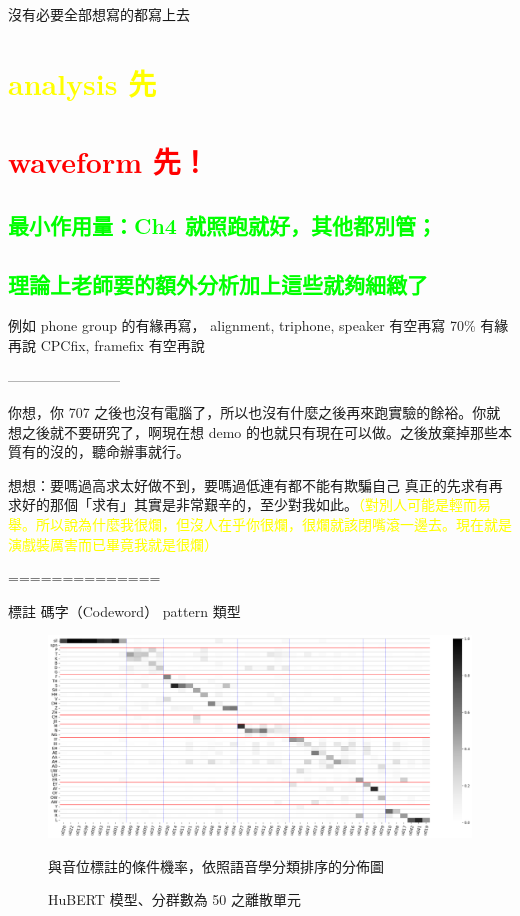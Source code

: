 
沒有必要全部想寫的都寫上去

\chapter{\textcolor{yellow}{analysis 先}}
\chapter{\textcolor{red}{waveform 先！}}

\section{\textcolor{lime}{最小作用量：Ch4 就照跑就好，其他都別管；}}
\section{\textcolor{lime}{理論上老師要的額外分析加上這些就夠細緻了}}

例如 phone group 的有緣再寫，
alignment, triphone, speaker 有空再寫
70\% 有緣再說
CPCfix, framefix 有空再說

\centering

------------------------

你想，你 707 之後也沒有電腦了，所以也沒有什麼之後再來跑實驗的餘裕。你就想之後就不要研究了，啊現在想 demo 的也就只有現在可以做。之後放棄掉那些本質有的沒的，聽命辦事就行。

想想：要嗎過高求太好做不到，要嗎過低連有都不能有欺騙自己
真正的先求有再求好的那個「求有」其實是非常艱辛的，至少對我如此。\textcolor{yellow}{（對別人可能是輕而易舉。所以說為什麼我很爛，但沒人在乎你很爛，很爛就該閉嘴滾一邊去。現在就是演戲裝厲害而已畢竟我就是很爛）}

==============

標註
碼字（Codeword）
pattern 類型



\begin{figure}
    \centering
    \includegraphics[width=1\linewidth]{figures/hubert-50-givenunit-byphn.png}
    \caption[]{
        HuBERT 模型、分群數為 50 之離散單元
        }  %
                       與音位標註的條件機率，依照語音學分類排序的分佈圖
    \label{fig:hubert-50-givenunit-byphn}
\end{figure}
